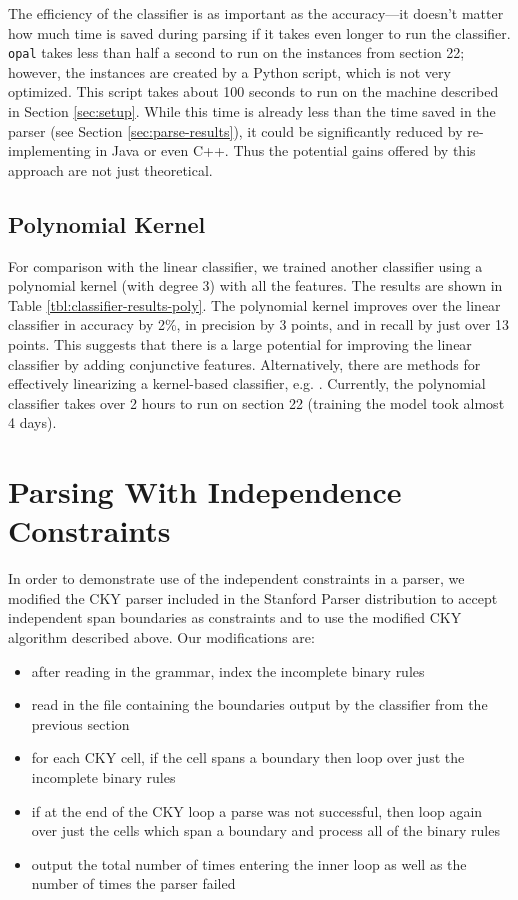 \documentclass[11pt]{article}
\begin{document}
The efficiency of the classifier is as important as the accuracy---it doesn't
matter how much time is saved during parsing if it takes even longer to run the
classifier. \texttt{opal} takes less than half a second to run on the instances from
section 22; however, the instances are created by a Python script, which is not
very optimized. This script takes about 100 seconds to run on the machine
described in Section \ref{sec:setup}. While this time is already less than the
time saved in the parser (see Section \ref{sec:parse-results}), it could be
significantly reduced by re-implementing in Java or even C++. Thus the potential
gains offered by this approach are not just theoretical.

\subsection{Polynomial Kernel}
\label{sec-4-6}

\label{sec:poly-classifier} For comparison with the linear classifier,
we trained another classifier using a polynomial kernel (with
degree 3) with all the features. The results are shown in Table
\ref{tbl:classifier-results-poly}. The polynomial kernel improves over
the linear classifier in accuracy by 2\%, in precision by 3 points, and
in recall by just over 13 points. This suggests that there is a large
potential for improving the linear classifier by adding conjunctive
features. Alternatively, there are methods for effectively linearizing
a kernel-based classifier, e.g. \cite{Kudo2003,Isozaki2002}.
Currently, the polynomial classifier takes over 2 hours to run on
section 22 (training the model took almost 4 days).



\section{Parsing With Independence Constraints}
\label{sec-5}
\label{sec:parser}

In order to demonstrate use of the independent constraints in a
parser, we modified the CKY parser included in the Stanford Parser
distribution to accept independent span boundaries as constraints and
to use the modified CKY algorithm described above. Our modifications
are:

\begin{itemize}
\item after reading in the grammar, index the incomplete binary rules
\item read in the file containing the boundaries output by the classifier
from the previous section
\item for each CKY cell, if the cell spans a boundary then loop over just
the incomplete binary rules
\item if at the end of the CKY loop a parse was not successful, then loop
again over just the cells which span a boundary and process all of
the binary rules
\item output the total number of times entering the inner loop as well as the
number of times the parser failed
\end{itemize}
\end{document}
